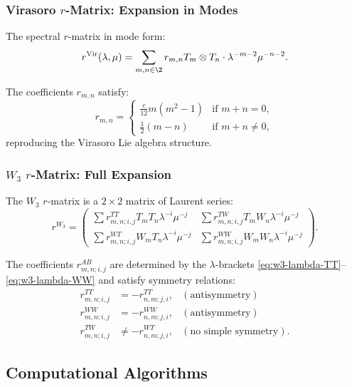 \subsubsection{Virasoro $r$-Matrix: Expansion in Modes}

The spectral $r$-matrix in mode form:
\begin{equation}
r^{\text{Vir}}(\lambda, \mu) = \sum_{m,n \in \Z} r_{m,n} T_m \otimes T_n \cdot \lambda^{-m-2} \mu^{-n-2}.
\end{equation}

The coefficients $r_{m,n}$ satisfy:
\begin{equation}
r_{m,n} = \begin{cases}
\frac{c}{12} m(m^2-1) & \text{if } m+n = 0,\\
\frac{1}{2}(m-n) & \text{if } m+n \neq 0,
\end{cases}
\end{equation}
reproducing the Virasoro Lie algebra structure.

\subsubsection{$W_3$ $r$-Matrix: Full Expansion}

The $W_3$ $r$-matrix is a $2 \times 2$ matrix of Laurent series:
\begin{equation}
r^{W_3} = \begin{pmatrix}
\sum r^{TT}_{m,n; i,j} T_m T_n \lambda^{-i} \mu^{-j} & \sum r^{TW}_{m,n; i,j} T_m W_n \lambda^{-i} \mu^{-j}\\
\sum r^{WT}_{m,n; i,j} W_m T_n \lambda^{-i} \mu^{-j} & \sum r^{WW}_{m,n; i,j} W_m W_n \lambda^{-i} \mu^{-j}
\end{pmatrix}.
\end{equation}

The coefficients $r^{AB}_{m,n; i,j}$ are determined by the $\lambda$-brackets \eqref{eq:w3-lambda-TT}--\eqref{eq:w3-lambda-WW} and satisfy symmetry relations:
\begin{align}
r^{TT}_{m,n; i,j} &= -r^{TT}_{n,m; j,i}, & (\text{antisymmetry})\\
r^{WW}_{m,n; i,j} &= -r^{WW}_{n,m; j,i}, & (\text{antisymmetry})\\
r^{TW}_{m,n; i,j} &\neq -r^{WT}_{n,m; j,i}, & (\text{no simple symmetry}).
\end{align}

\subsection{Computational Algorithms}

